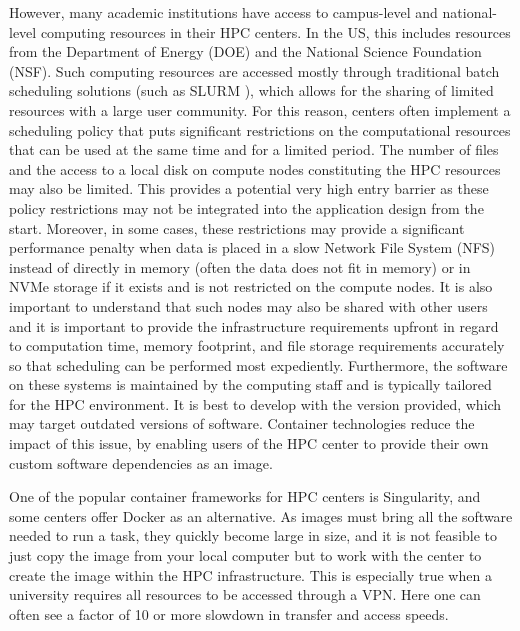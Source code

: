 \documentclass[utf8]{FrontiersinVancouver} %
\begin{document}
However, many academic institutions have access to campus-level and national-level computing resources in their HPC centers. In the US, this includes resources from the Department of Energy (DOE) and the National Science Foundation (NSF). Such computing resources are accessed mostly through traditional batch scheduling solutions (such as SLURM \citep{www-slurm}), which allows for the sharing of limited resources with a large user community. For this reason, centers often implement a scheduling policy that puts significant restrictions on the computational resources that can be used at the same time and for a limited period. The number of files and the access to a local disk on compute nodes constituting the HPC resources may also be limited.  This provides a potential very high entry barrier as these policy restrictions may not be integrated into the application design from the start.  Moreover, in some cases, these restrictions may provide a significant performance penalty when data is placed in a slow Network File System (NFS) instead of directly in memory (often the data does not fit in memory) or in NVMe storage if it exists and is not restricted on the compute nodes.  It is also important to understand that such nodes may also be shared with other users and it is important to provide the infrastructure requirements upfront in regard to computation time, memory footprint, and file storage requirements accurately so that scheduling can be performed most expediently.  Furthermore, the software on these systems is maintained by the computing staff and is typically tailored for the HPC environment.  It is best to develop with the version provided, which may target outdated versions of software.  Container technologies reduce the impact of this issue, by enabling users of the HPC center to provide their own custom software dependencies as an image.

One of the popular container frameworks for HPC centers is Singularity, and some centers offer Docker as an alternative. As images must bring all the software needed to run a task, they quickly become large in size, and it is not feasible to just copy the image from your local computer but to work with the center to create the image within the HPC infrastructure. This is especially true when a university requires all resources to be accessed through a VPN. Here one can often see a factor of 10 or more slowdown in transfer and access speeds.
\end{document}
